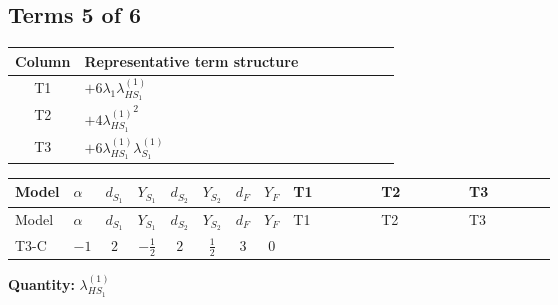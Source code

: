 \documentclass[8pt]{article}
\begin{document}
\begin{landscape}
\subsection*{Terms 5 of 6}
\begin{center}
\begin{tabular}{@{}c >{\raggedright\arraybackslash}p{0.82\linewidth}@{}}
\toprule
Column & Representative term structure \\
\midrule
T1 & \(\displaystyle +6 {\lambda_1} {\lambda_{HS_1}^{(1)}}\) \\
\midrule
T2 & \(\displaystyle +4 {\lambda_{HS_1}^{(1)}}^2\) \\
\midrule
T3 & \(\displaystyle +6 {\lambda_{HS_1}^{(1)}} {\lambda_{S_1}^{(1)}}\) \\
\midrule
\bottomrule
\end{tabular}
\end{center}
\smallskip
\tiny
\begin{longtable}{@{}llcccccc >{\raggedright\arraybackslash}p{0.21\linewidth} >{\raggedright\arraybackslash}p{0.21\linewidth} >{\raggedright\arraybackslash}p{0.21\linewidth}@{}}
\toprule
Model & $\alpha$ & $d_{S_1}$ & $Y_{S_1}$ & $d_{S_2}$ & $Y_{S_2}$ & $d_F$ & $Y_F$ & T1 & T2 & T3 \\
\midrule
\endfirsthead
\toprule
Model & $\alpha$ & $d_{S_1}$ & $Y_{S_1}$ & $d_{S_2}$ & $Y_{S_2}$ & $d_F$ & $Y_F$ & T1 & T2 & T3 \\
\midrule
\endhead
T3-C & $-1$ & $2$ & $-\frac{1}{2}$ & $2$ & $\frac{1}{2}$ & $3$ & $0$ & \scriptsize\adjustbox{max width=\linewidth}{$\begin{gathered} +6 {\lambda_1} {\lambda_{HS_1}^{(1)}}\end{gathered}$} & \scriptsize\adjustbox{max width=\linewidth}{$\begin{gathered} +4 {\lambda_{HS_1}^{(1)}}^2\end{gathered}$} & \scriptsize\adjustbox{max width=\linewidth}{$\begin{gathered} +6 {\lambda_{HS_1}^{(1)}} {\lambda_{S_1}^{(1)}}\end{gathered}$} \\
\midrule
\bottomrule
\end{longtable}
\clearpage
\noindent\textbf{Quantity: }$\lambda_{HS_1}^{(1)}$\par\smallskip

\end{landscape}
\end{document}
